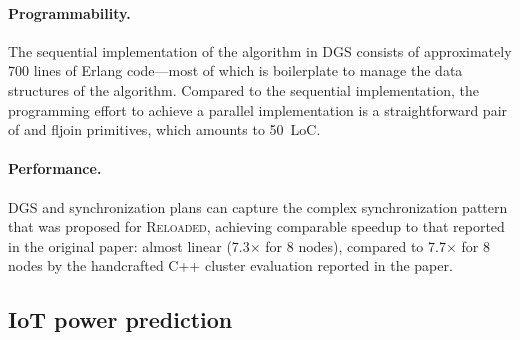\paragraph{Programmability.}
The sequential implementation of the algorithm in DGS consists of approximately 700
lines of Erlang code---most of which is boilerplate to manage the
data structures of the algorithm.
Compared to the sequential implementation, the programming effort to achieve a
parallel implementation is a straightforward pair of  and fl{join} primitives, which amounts to 50~LoC.

\paragraph{Performance.}
DGS and synchronization plans can capture the complex synchronization pattern that was proposed for \textsc{Reloaded}, achieving comparable speedup to that reported in the original paper:
almost linear (7.3$\times$ for 8 nodes), compared to 7.7$\times$ for 8 nodes by the handcrafted C++ cluster evaluation reported in the paper.

\subsection{IoT power prediction}
\label{dgs:ssec:iot-case-study}

